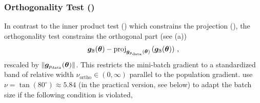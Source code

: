 \subsubsection{Orthogonality Test ()}\label{cockpit::app:orthogonality-test}
In contrast to the inner product test ()
which constrains the projection (),
the orthogonality test \citep{bollapragada2017adaptive} constrains the
orthogonal part (see  (a))
\begin{align}
  \label{cockpit::eq:orthogonality-projection}
  {\bm{g}}_{{\mathbb{B}}}({\bm{\theta}})
  -
  \mathrm{proj}_{{\bm{g}}_{p_{\mathrm{data}}}({\bm{\theta}})}\left({\bm{g}}_{{\mathbb{B}}}({\bm{\theta}})\right)\,,
\end{align}
rescaled by $\lVert {\bm{g}}_{p_{\mathrm{data}}}({\bm{\theta}}) \rVert$. This restricts the mini-batch
gradient to a standardized band of relative width $\nu_{\text{ortho}} \in (0,
\infty)$ parallel to the population gradient. \citet{bollapragada2017adaptive} use $\nu
= \tan(80^{\circ}) \approx 5.84$ (in the practical version, see below) to adapt
the batch size if the following condition is violated,
